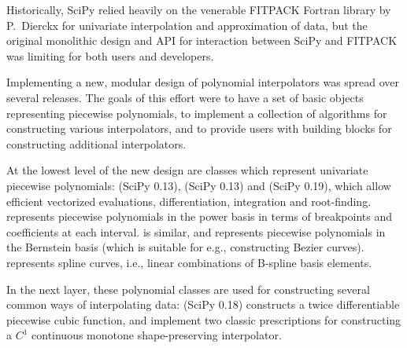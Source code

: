 Historically, SciPy relied heavily on the venerable FITPACK
Fortran library by P.~Dierckx \cite{Dierckx:1993:CSF:151103, FITPACK} for
univariate interpolation and approximation of data, but the original monolithic
design and API for interaction between SciPy and FITPACK was limiting for both
users and developers.

Implementing a new, modular design of polynomial interpolators was spread over
several releases. The goals of this effort were to have a set of basic objects
representing piecewise polynomials, to implement a collection of algorithms
for constructing various interpolators, and to provide users with building
blocks for constructing additional interpolators.

At the lowest level of the new design are classes which represent univariate
piecewise polynomials:  (SciPy 0.13)\cite{scipy-gh2885},
 (SciPy 0.13) and  (SciPy 0.19)\cite{scipy-gh3174},
which allow
efficient vectorized evaluations, differentiation, integration and root-finding.
 represents piecewise polynomials in the power basis in terms of
breakpoints and coefficients at each interval.  is similar, and
represents piecewise polynomials in the Bernstein basis (which is suitable
for e.g., constructing Bezier curves).  represents spline
curves, i.e., linear combinations of B-spline basis elements.\cite{deBoor1978} 

In the next layer, these polynomial classes are used for constructing several
common ways of interpolating data:  (SciPy 0.18)
\cite{scipy-gh5653} constructs a twice 
differentiable piecewise cubic function,  
and  implement two classic prescriptions for
constructing a $C^1$ continuous monotone shape-preserving interpolator.
\cite{FritschCarlson1980, Akima1970}
